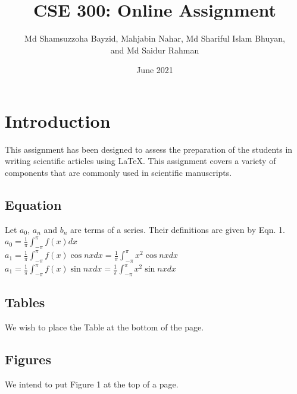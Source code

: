 \documentclass[12pt, a4paper]{article} %
\title{CSE 300: Online Assignment}
\author{Md Shamsuzzoha Bayzid, Mahjabin Nahar, Md Shariful Islam Bhuyan,\\
	and Md Saidur Rahman
}
\date{June 2021}
\begin{document}
	\maketitle
	
	\section{Introduction}
	This assignment has been designed to assess the preparation of the students
	in writing scientific articles using \LaTeX. This assignment covers a variety of
	components that are commonly used in scientific manuscripts.
	

	
	\subsection{Equation}
	Let $a_0$, $a_n$ and $b_n$ are terms of a series. Their definitions are given by Eqn. 1.\\
	
	$
	a_0 = \frac{1}{\pi} \int_{-\pi}^{\pi}f(x)dx $ \\
	$a_1 = \frac{1}{\pi} \int_{-\pi}^{\pi} f(x)\cos nx dx = \frac{1}{\pi} \int_{-\pi}^{\pi} x^2\cos nx dx
	$ \\
	$
	a_1 = \frac{1}{\pi} \int_{-\pi}^{\pi} f(x)\sin nx dx = \frac{1}{\pi} \int_{-\pi}^{\pi} x^2\sin nx dx
	$
	\subsection{Tables}
	We wish to place the Table at the bottom of the page.
	
	\subsection{Figures}
	We intend to put Figure 1 at the top of a page.
	
	\pagebreak
%	
		
\end{document}
